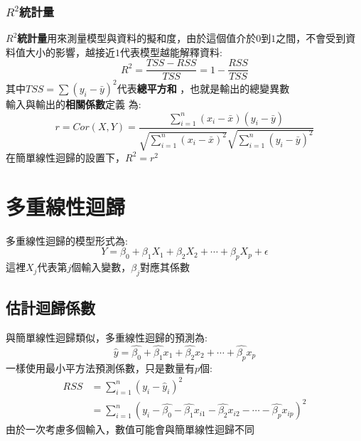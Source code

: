 \documentclass{report} %
\begin{document}
	  \subsubsection{$R ^ 2$統計量}
        {\bf $R ^ 2$統計量}用來測量模型與資料的擬和度，由於這個值介於$0$到$1$之間，不會受到資
          料值大小的影響，越接近$1$代表模型越能解釋資料:
        \begin{equation}
          R ^ 2 = \frac{TSS - RSS}{TSS} = 1 - \frac{RSS}{TSS}
        \end{equation}
        其中$TSS = \sum{(y_i - \bar{y}) ^ 2}$代表{\bf 總平方和}
          ，也就是輸出的總變異數 \\
        輸入與輸出的{\bf 相關係數}定義
          為:
        \begin{equation}
          r = Cor(X, Y) = \frac{\sum_{i = 1} ^ {n}(x_i - \bar{x}) (y_i - \bar{y})}{\sqrt{\sum_{i = 1} ^ {n}(x_i - \bar{x}) ^ 2}\sqrt{\sum_{i = 1} ^ {n}(y_i - \bar{y}) ^ 2}}
        \end{equation}
        在簡單線性迴歸的設置下，$R ^ 2 = r ^ 2$
  \section{多重線性迴歸}
    多重線性迴歸的模型形式為:
    \begin{equation}
      Y = \beta_0 + \beta_1 X_1 + \beta_2 X_2 + \cdots + \beta_p X_p
        + \epsilon
    \end{equation}
    這裡$X_j$代表第$j$個輸入變數，$\beta_j$對應其係數
    \subsection{估計迴歸係數}
      與簡單線性迴歸類似，多重線性迴歸的預測為:
      \begin{equation}
        \hat{y} = \hat{\beta_0} + \hat{\beta_1} x_1 + \hat{\beta_2}
         x_2 + \cdots + \hat{\beta_p} x_p
      \end{equation}
      一樣使用最小平方法預測係數，只是數量有$p$個:
      \begin{equation}
        \begin{split}
          RSS & = \sum_{i = 1} ^ {n}(y_i - \hat{y}_i) ^ 2 \\
              & = \sum_{i = 1} ^ {n}(y_i - \hat{\beta_0} -
                \hat{\beta_1} x_{i1} - \hat{\beta_2} x_{i2} - \cdots - \hat{\beta_p} x_{ip}) ^ 2
        \end{split}
      \end{equation}
      由於一次考慮多個輸入，數值可能會與簡單線性迴歸不同
\end{document}
